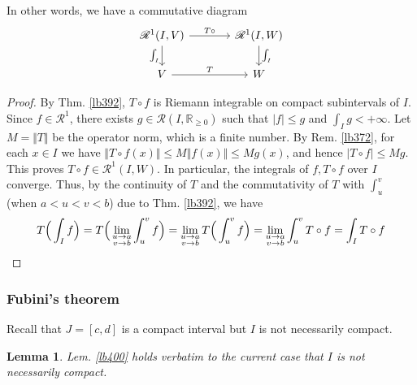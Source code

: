 \documentclass[12pt,b5paper,notitlepage]{article}
\theoremstyle{definition}
\theoremstyle{plain}
\newtheorem{lm}[df]{Lemma}
\newcommand{\scr}{\mathscr}
\newcommand{\Rbb}{\mathbb R}
\numberwithin{equation}{section}
\begin{document}
In other words, we have a commutative diagram
\begin{equation}\label{eq175}
\begin{tikzcd}[column sep=large]
\scr R^1(I,V) \arrow[r,"T\circ"] \arrow[d,"\int_I"'] & \scr R^1(I,W) \arrow[d,"\int_I"] \\
V \arrow[r,"T"]           & W        
\end{tikzcd} 
\end{equation}


\begin{proof}
By Thm. \ref{lb392}, $T\circ f$ is Riemann integrable on compact subintervals of $I$. Since $f\in\scr R^1$, there exists $g\in\scr R(I,\Rbb_{\geq0})$ such that $|f|\leq g$ and $\int_Ig<+\infty$. Let $M=\Vert T\Vert$ be the operator norm, which is a finite number. By Rem. \ref{lb372}, for each $x\in I$ we have $\Vert T\circ f(x)\Vert\leq M\Vert f(x)\Vert\leq Mg(x)$, and hence $|T\circ f|\leq Mg$. This proves $T\circ f\in\scr R^1(I,W)$. In particular, the integrals of $f,T\circ f$ over $I$ converge. Thus, by the continuity of $T$ and the commutativity of $T$ with $\int_u^v$ (when  $a<u<v<b$) due to Thm. \ref{lb392}, we have
\begin{align*}
T\Big(\int_If\Big)=T\Big(\lim_{
\begin{subarray}{c}
u\rightarrow a\\
v\rightarrow b
\end{subarray}}\int_u^v f\Big)=\lim_{
\begin{subarray}{c}
u\rightarrow a\\
v\rightarrow b
\end{subarray}}T\Big(\int_u^v f\Big)=\lim_{
\begin{subarray}{c}
u\rightarrow a\\
v\rightarrow b
\end{subarray}}\int_u^v T\circ f=\int_IT\circ f
\end{align*}
\end{proof}



\subsubsection{Fubini's theorem}

Recall that $J=[c,d]$ is a compact interval but $I$ is not necessarily compact.

\begin{lm}\label{lb423}
Lem. \ref{lb400} holds verbatim to the current case that $I$ is not necessarily compact.
\end{lm}
\end{document}
